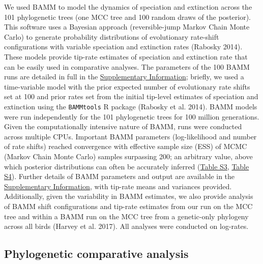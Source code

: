 \documentclass[]{article}
\begin{document}
We used BAMM to model the dynamics of speciation and extinction across
the 101 phylogenetic trees (one MCC tree and 100 random draws of the
posterior). This software uses a Bayesian approach (reversible-jump
Markov Chain Monte Carlo) to generate probability distributions of
evolutionary rate-shift configurations with variable speciation and
extinction rates (Rabosky 2014). These models provide tip-rate estimates
of speciation and extinction rate that can be easily used in comparative
analyses. The parameters of the 100 BAMM runs are detailed in full in
the
\href{https://justincally.github.io/SexualSelection_Speciation/#set_up_bamm_parameters}{Supplementary Information};
briefly, we used a time-variable model with the prior expected number of
evolutionary rate shifts set at 100 and prior rates set from the initial
tip-level estimates of speciation and extinction using the
\texttt{BAMMtools} R package (Rabosky et al. 2014). BAMM models were run
independently for the 101 phylogenetic trees for 100 million
generations. Given the computationally intensive nature of BAMM, runs
were conducted across multiple CPUs. Important BAMM parameters
(log-likelihood and number of rate shifts) reached convergence with
effective sample size (ESS) of MCMC (Markov Chain Monte Carlo) samples
surpassing 200; an arbitrary value, above which posterior distributions
can often be accurately inferred
(\href{https://justincally.github.io/SexualSelection_Speciation/#bamm_measures_of_speciation_and_extinction}{Table S3},
\href{https://justincally.github.io/SexualSelection_Speciation/#bamm_measures_of_speciation_and_extinction}{Table S4}).
Further details of BAMM parameters and output are available in the
\href{https://justincally.github.io/SexualSelection_Speciation/}{Supplementary Information},
with tip-rate means and variances provided. Additionally, given the
variability in BAMM estimates, we also provide analysis of BAMM shift
configurations and tip-rate estimates from our run on the MCC tree and
within a BAMM run on the MCC tree from a genetic-only phylogeny across
all birds (Harvey et al. 2017). All analyses were conducted on
log-rates. 

\hypertarget{phylogenetic-comparative-analysis}{%
\subsection{Phylogenetic comparative
analysis}\label{phylogenetic-comparative-analysis}}
\end{document}
